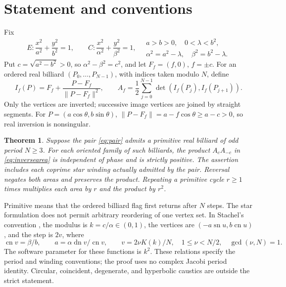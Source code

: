 \documentclass[11pt]{article}
\newtheorem{theorem}{Theorem}
\DeclareMathOperator{\sn}{sn}
\DeclareMathOperator{\cn}{cn}
\DeclareMathOperator{\dn}{dn}
\begin{document}
\section{Statement and conventions}

Fix
\begin{equation}\label{eq:pair}
 E:\frac{x^2}{a^2}+\frac{y^2}{b^2}=1,
 \qquad C:\frac{x^2}{\alpha^2}+\frac{y^2}{\beta^2}=1,
 \quad
 \begin{gathered}
 a>b>0,\quad 0<\lambda<b^2,\\
 \alpha^2=a^2-\lambda,\quad\beta^2=b^2-\lambda.
 \end{gathered}
\end{equation}
Put \(c=\sqrt{a^2-b^2}>0\), so \(\alpha^2-\beta^2=c^2\), and let
\(F_f=(f,0)\), \(f=\pm c\). For an ordered real billiard
\((P_0,\ldots,P_{N-1})\), with indices taken modulo \(N\), define
\begin{equation}\label{eq:inversearea}
 I_f(P)=F_f+\frac{P-F_f}{\|P-F_f\|^2},\qquad
 A_f=\frac12\sum_{j=0}^{N-1}\det(I_f(P_j),I_f(P_{j+1})).
\end{equation}
Only the vertices are inverted; successive image vertices are joined by
straight segments. For \(P=(a\cos\theta,b\sin\theta)\),
\(\|P-F_f\|=a-f\cos\theta\ge a-c>0\), so real inversion is nonsingular.

\begin{theorem}\label{thm:main}
Suppose the pair \eqref{eq:pair} admits a primitive real billiard of odd
period \(N\ge3\). For each oriented family of such billiards, the product
\(A_cA_{-c}\) in \eqref{eq:inversearea} is independent of phase and is
strictly positive. The assertion includes each coprime star winding
actually admitted by the pair. Reversal negates both areas and preserves
the product. Repeating a primitive cycle \(r\ge1\) times multiplies each
area by \(r\) and the product by \(r^2\).
\end{theorem}

Primitive means that the ordered billiard flag first returns after
\(N\) steps. The star formulation does not permit arbitrary reordering
of one vertex set. In Stachel's convention \cite[Theorem~4.3]{Stachel},
the modulus is \(k=c/\alpha\in(0,1)\), the vertices are
\((-a\sn u,b\cn u)\), and the step is \(2v\), where
\[
 \cn v=\beta/b,\qquad a=\alpha\dn v/\cn v,\qquad
 v=2\nu K(k)/N,\quad 1\le\nu<N/2,\quad\gcd(\nu,N)=1.
\]
The software parameter for these functions is \(k^2\). These relations
specify the period and winding conventions; the proof uses no complex
Jacobi period identity. Circular, coincident, degenerate, and hyperbolic
caustics are outside the strict statement.
\end{document}
